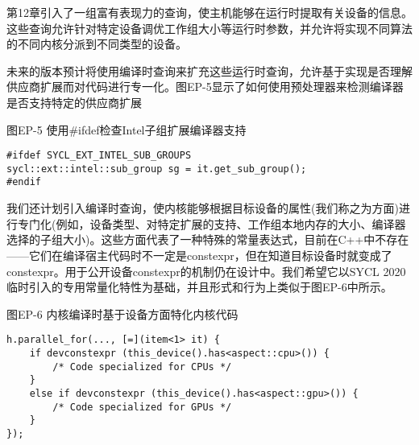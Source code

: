 第12章引入了一组富有表现力的查询，使主机能够在运行时提取有关设备的信息。这些查询允许针对特定设备调优工作组大小等运行时参数，并允许将实现不同算法的不同内核分派到不同类型的设备。\par

未来的版本预计将使用编译时查询来扩充这些运行时查询，允许基于实现是否理解供应商扩展而对代码进行专一化。图EP-5显示了如何使用预处理器来检测编译器是否支持特定的供应商扩展\par

\hspace*{\fill} \par %
图EP-5 使用\#ifdef检查Intel子组扩展编译器支持
\begin{lstlisting}[caption={}]
#ifdef SYCL_EXT_INTEL_SUB_GROUPS
sycl::ext::intel::sub_group sg = it.get_sub_group();
#endif
\end{lstlisting}

我们还计划引入编译时查询，使内核能够根据目标设备的属性(我们称之为方面)进行专门化(例如，设备类型、对特定扩展的支持、工作组本地内存的大小、编译器选择的子组大小)。这些方面代表了一种特殊的常量表达式，目前在C++中不存在——它们在编译宿主代码时不一定是constexpr，但在知道目标设备时就变成了constexpr。用于公开设备constexpr的机制仍在设计中。我们希望它以SYCL 2020临时引入的专用常量化特性为基础，并且形式和行为上类似于图EP-6中所示。\par

\hspace*{\fill} \par %
图EP-6 内核编译时基于设备方面特化内核代码
\begin{lstlisting}[caption={}]
h.parallel_for(..., [=](item<1> it) {
	if devconstexpr (this_device().has<aspect::cpu>()) {
		/* Code specialized for CPUs */
	}
	else if devconstexpr (this_device().has<aspect::gpu>()) {
		/* Code specialized for GPUs */
	}
});
\end{lstlisting}






















































